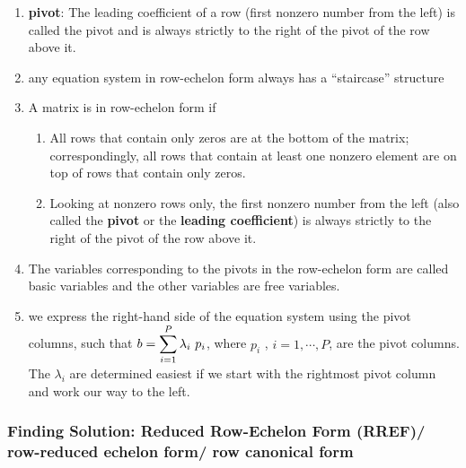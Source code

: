 \begin{enumerate}
    \item \textbf{pivot}: The leading coefficient of a row (first nonzero number from the left) is called the pivot and is always strictly to the right of the pivot of the row above it.
    \hfill \cite{mfml/book/mml/Deisenroth-Faisal-Ong}

    \item any equation system in row-echelon form always has a “staircase” structure
    \hfill \cite{mfml/book/mml/Deisenroth-Faisal-Ong}

    \item A matrix is in row-echelon form if
    \begin{enumerate}
        \item All rows that contain only zeros are at the bottom of the matrix; correspondingly, all rows that contain at least one nonzero element are on top of rows that contain only zeros.
        \hfill \cite{mfml/book/mml/Deisenroth-Faisal-Ong}

        \item Looking at nonzero rows only, the first nonzero number from the left (also called the \textbf{pivot} or the \textbf{leading coefficient}) is always strictly to the right of the pivot of the row above it.
        \hfill \cite{mfml/book/mml/Deisenroth-Faisal-Ong}
    \end{enumerate}

    \item The variables corresponding to the pivots in the row-echelon form are called basic variables and the other variables are free variables.
    \hfill \cite{mfml/book/mml/Deisenroth-Faisal-Ong}

    \item we express the right-hand side of the equation system using the pivot columns, such that $b = \displaystyle\sum^P_{i=1} \lambda_i\ p_i$, where $p_i$ , $i = 1, \cdots , P$, are the pivot columns. 
    \\
    The $\lambda_i$ are determined easiest if we start with the rightmost pivot column and work our way to the left.
    \hfill \cite{mfml/book/mml/Deisenroth-Faisal-Ong}

    
\end{enumerate}








\subsubsection{Finding Solution: Reduced Row-Echelon Form (RREF)/ row-reduced echelon form/ row canonical form \cite{mfml/book/mml/Deisenroth-Faisal-Ong}}

